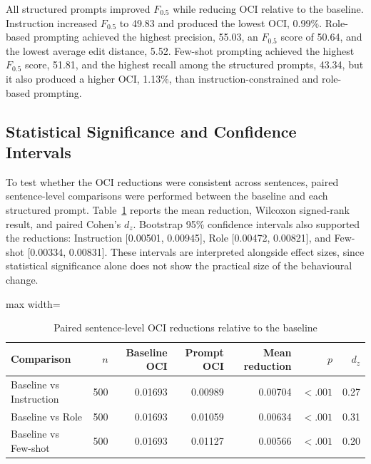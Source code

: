 All structured prompts improved $F_{0.5}$ while reducing OCI relative to the baseline. Instruction increased $F_{0.5}$ to 49.83 and produced the lowest OCI, 0.99\%. Role-based prompting achieved the highest precision, 55.03, an $F_{0.5}$ score of 50.64, and the lowest average edit distance, 5.52. Few-shot prompting achieved the highest $F_{0.5}$ score, 51.81, and the highest recall among the structured prompts, 43.34, but it also produced a higher OCI, 1.13\%, than instruction-constrained and role-based prompting.

\subsection{Statistical Significance and Confidence Intervals}

To test whether the OCI reductions were consistent across sentences, paired sentence-level comparisons were performed between the baseline and each structured prompt. Table~\ref{tab:exp2_paired_oci_tests} reports the mean reduction, Wilcoxon signed-rank result, and paired Cohen's $d_z$. Bootstrap 95\% confidence intervals also supported the reductions: Instruction [0.00501, 0.00945], Role [0.00472, 0.00821], and Few-shot [0.00334, 0.00831]. These intervals are interpreted alongside effect sizes, since statistical significance alone does not show the practical size of the behavioural change.

\begin{table}[htbp]
    \centering
    \caption{Paired sentence-level OCI reductions relative to the baseline}
    \label{tab:exp2_paired_oci_tests}
    \renewcommand{\arraystretch}{1.15}
    \begin{adjustbox}{max width=\textwidth}
    \begin{tabular}{lrrrrrr}
        \toprule
        \textbf{Comparison} & \textbf{$n$} & \textbf{Baseline OCI} & \textbf{Prompt OCI} & \textbf{Mean reduction} & \textbf{$p$} & \textbf{$d_z$} \\
        \midrule
        Baseline vs Instruction & 500 & 0.01693 & 0.00989 & 0.00704 & $< .001$ & 0.27 \\
        Baseline vs Role           & 500 & 0.01693 & 0.01059 & 0.00634 & $< .001$ & 0.31 \\
        Baseline vs Few-shot       & 500 & 0.01693 & 0.01127 & 0.00566 & $< .001$ & 0.20 \\
        \bottomrule
    \end{tabular}
    \end{adjustbox}
\end{table}

